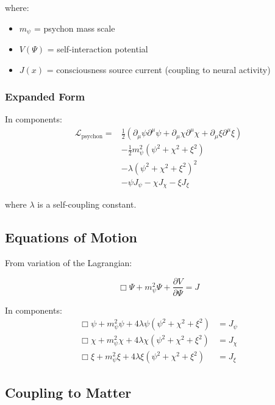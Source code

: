 where:
\begin{itemize}
    \item $m_\psi$ = psychon mass scale
    \item $V(\Psi)$ = self-interaction potential
    \item $J(x)$ = consciousness source current (coupling to neural activity)
\end{itemize}

\subsubsection{Expanded Form}

In components:
\begin{align}
\mathcal{L}_{\text{psychon}} = &\frac{1}{2}(\partial_\mu \psi \partial^\mu \psi + \partial_\mu \chi \partial^\mu \chi + \partial_\mu \xi \partial^\mu \xi) \\
&- \frac{1}{2} m_\psi^2 (\psi^2 + \chi^2 + \xi^2) \\
&- \lambda (\psi^2 + \chi^2 + \xi^2)^2 \\
&- \psi J_\psi - \chi J_\chi - \xi J_\xi
\end{align}

where $\lambda$ is a self-coupling constant.

\subsection{Equations of Motion}

From variation of the Lagrangian:

\begin{equation}
\label{eq:canonical:psychon_eom}
\boxed{
\Box \Psi + m_\psi^2 \Psi + \frac{\partial V}{\partial \Psi} = J
}
\end{equation}

In components:
\begin{align}
\Box \psi + m_\psi^2 \psi + 4\lambda \psi(\psi^2 + \chi^2 + \xi^2) &= J_\psi \\
\Box \chi + m_\psi^2 \chi + 4\lambda \chi(\psi^2 + \chi^2 + \xi^2) &= J_\chi \\
\Box \xi + m_\psi^2 \xi + 4\lambda \xi(\psi^2 + \chi^2 + \xi^2) &= J_\xi
\end{align}

\subsection{Coupling to Matter}

